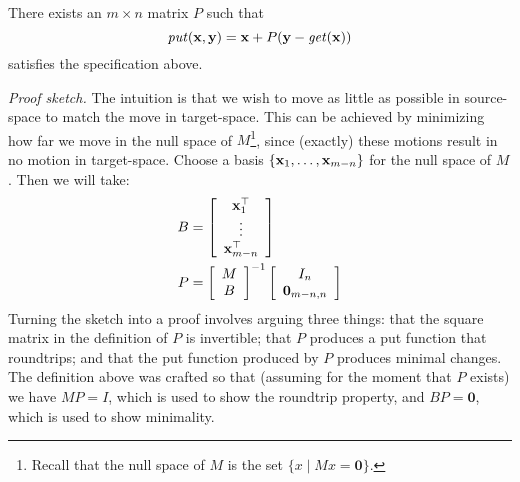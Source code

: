 \begin{lemma}
    There exists an $m \times n$ matrix $P$ such that
    \[\mathit{put}(\mathbf x,\mathbf y) = \mathbf x + P(\mathbf y - \mathit{get}(\mathbf x))\]
    satisfies the specification above.
\end{lemma}
\emph{Proof sketch.} The intuition is that we wish to move as little as
possible in source-space to match the move in target-space. This can be
achieved by minimizing how far we move in the null space of
$M$\footnote{Recall that the null space of $M$ is the set $\{x\mid
Mx=\mathbf 0\}$.}, since (exactly) these motions result in no motion in
target-space.
%
Choose a basis $\{\mathbf x_1,\ldots,\mathbf x_{m-n}\}$ for the null space of $M$. Then
we will take:
\begin{align*}
    B &= \left[\begin{array}{c}
            \mathbf x_1^\top \\
            \vdots \\
            \mathbf x_{m-n}^\top
        \end{array}\right] \\
    P &= \left[\begin{array}{c}
            M \\
            B
        \end{array}\right]^{-1}
        \left[\begin{array}{c}
            I_n \\
            \mathbf 0_{m-n,n}
        \end{array}\right] \\
\end{align*}
Turning the sketch into a proof involves arguing three things: that the
square matrix in the definition of $P$ is invertible; that $P$ produces a
put function that roundtrips; and that the put function produced by $P$
produces minimal changes. The definition above was crafted so that (assuming
for the moment that $P$ exists) we have $MP = I$, which is used to show the
roundtrip property, and $BP = \mathbf 0$, which is used to show minimality.



